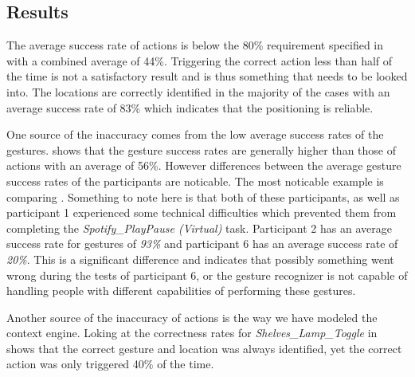 \subsection{Results}
\label{sec:evaluation:user-tests-results}

The average success rate of actions is below the 80\% requirement specified in  with a combined average of 44\%.
Triggering the correct action less than half of the time is not a satisfactory result and is thus something that needs to be looked into.
The locations are correctly identified in the majority of the cases with an average success rate of 83\% which indicates that the positioning is reliable.

One source of the inaccuracy comes from the low average success rates of the gestures.
 shows that the gesture success rates are generally higher than those of actions with an average of 56\%.
However differences between the average gesture success rates of the participants are noticable.
The most noticable example is comparing .
Something to note here is that both of these participants, as well as participant 1 experienced some technical difficulties which prevented them from completing the \emph{Spotify\_PlayPause (Virtual)} task.
Participant 2 has an average success rate for gestures of \emph{93\%} and participant 6 has an average success rate of \emph{20\%}.
This is a significant difference and indicates that possibly something went wrong during the tests of participant 6, or the gesture recognizer is not capable of handling people with different capabilities of performing these gestures.

Another source of the inaccuracy of actions is the way we have modeled the context engine.
Loking at the correctness rates for \emph{Shelves_Lamp_Toggle} in  shows that the correct gesture and location was always identified, yet the correct action was only triggered 40\% of the time.

